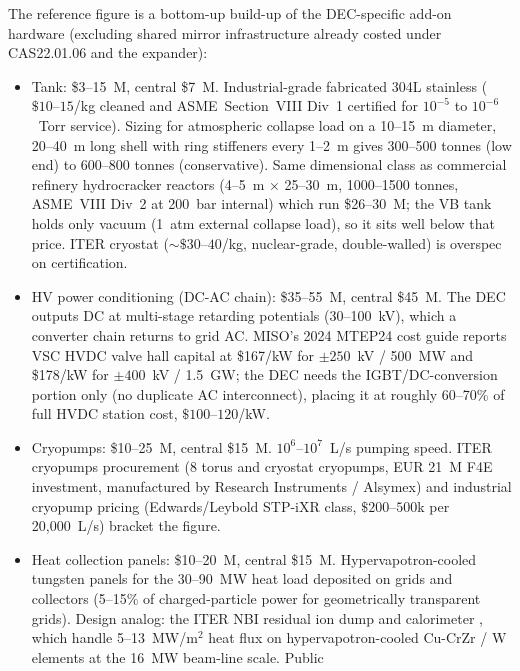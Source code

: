 \documentclass{article}
\begin{document}
The reference figure is a bottom-up build-up of the DEC-specific
add-on hardware (excluding shared mirror infrastructure already
costed under CAS22.01.06 and the expander):
\begin{itemize}
  \item Tank: \$3--15~M, central \$7~M.
    Industrial-grade fabricated 304L stainless ($\$10\text{--}15$/kg
    cleaned and ASME~Section~VIII Div~1 certified for $10^{-5}$ to
    $10^{-6}$~Torr service).  Sizing for atmospheric collapse load
    on a 10--15~m diameter, 20--40~m long shell with ring stiffeners
    every 1--2~m gives 300--500 tonnes (low end) to 600--800 tonnes
    (conservative). Same dimensional class as commercial refinery
    hydrocracker reactors \citep{exxonmobil_rotterdam_hydrocracker}
    (4--5~m $\times$ 25--30~m, 1000--1500 tonnes, ASME~VIII Div~2
    at 200~bar internal) which run \$26--30~M; the VB tank holds
    only vacuum (1~atm external collapse load), so it sits well
    below that price.  ITER cryostat ($\sim\$30\text{--}40$/kg,
    nuclear-grade, double-walled) is overspec on certification.
  \item HV power conditioning (DC-AC chain): \$35--55~M, central \$45~M.
    The DEC outputs DC at multi-stage retarding potentials (30--100~kV),
    which a converter chain returns to grid AC.  MISO's 2024 MTEP24
    cost guide \citep{miso2024mtep24} reports VSC HVDC valve hall
    capital at \$167/kW for $\pm 250$~kV / 500~MW and \$178/kW for
    $\pm 400$~kV / 1.5~GW; the DEC needs the IGBT/DC-conversion
    portion only (no duplicate AC interconnect), placing it at
    roughly 60--70\% of full HVDC station cost, $\$100\text{--}120$/kW.
  \item Cryopumps: \$10--25~M, central \$15~M.
    $10^6$--$10^7$~L/s pumping speed.  ITER cryopumps procurement
    \citep{iter_cryopumps} (8 torus and cryostat cryopumps, EUR 21~M
    F4E investment, manufactured by Research Instruments / Alsymex)
    and industrial cryopump pricing (Edwards/Leybold STP-iXR class,
    $\$200\text{--}500$k per 20,000~L/s) bracket the figure.
  \item Heat collection panels: \$10--20~M, central \$15~M.
    Hypervapotron-cooled tungsten panels for the 30--90~MW heat
    load deposited on grids and collectors (5--15\% of charged-particle
    power for geometrically transparent grids).  Design analog: the
    ITER NBI residual ion dump and calorimeter \citep{hemsworth2017},
    which handle 5--13~MW/m${}^2$ heat flux on hypervapotron-cooled
    Cu-CrZr / W elements at the 16~MW beam-line scale.  Public

\end{itemize}
\end{document}
